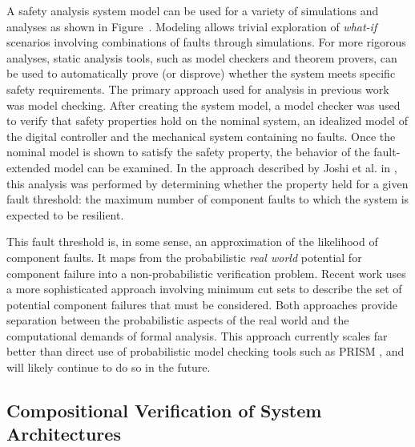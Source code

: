 

A safety analysis system model can be used for a variety of simulations and analyses as shown in Figure~. Modeling allows trivial exploration of \textit{what-if} scenarios involving combinations of faults through simulations. For more rigorous analyses, static analysis tools, such as model checkers and theorem provers, can be used to automatically prove (or disprove) whether the system meets specific safety requirements.
The primary approach used for analysis in previous work was model checking. After creating the system model, a model checker was used to verify that safety properties hold on the nominal system, an idealized model of the digital controller and the mechanical system containing no faults. Once the nominal model is shown to satisfy the safety property, the behavior of the fault-extended model can be examined. In the approach described by Joshi et al. in \cite{Joshi05:Dasc, Joshi05:SafeComp, Joshi07:Hase}, this analysis was performed by determining whether the property held for a given fault threshold: the maximum number of component faults to which the system is expected to be resilient.

This fault threshold is, in some sense, an approximation of the likelihood of component faults. It maps from the probabilistic \textit{real world} potential for component failure into a non-probabilistic verification problem. Recent work \cite{CAV2015:BoCiGrMa} uses a more sophisticated approach involving minimum cut sets to describe the set of potential component failures that must be considered. Both approaches provide separation between the probabilistic aspects of the real world and the computational demands of formal analysis. This approach currently scales far better than direct use of probabilistic model checking tools such as PRISM \cite{CAV2011:KwNoPa}, and will likely continue to do so in the future.

\iffalse
\subsection{Compositional Verification of System Architectures}

